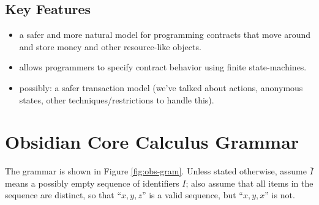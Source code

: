 \documentclass[runningheads,a4paper]{llncs}
\begin{document}
\subsection{Key Features}

\begin{itemize}
\item a safer and more natural model for programming contracts that move around and store money and other resource-like objects.
\item allows programmers to specify contract behavior using finite state-machines.
\item possibly: a safer transaction model (we've talked about actions, anonymous states, other techniques/restrictions to handle this).
\end{itemize}

\fi

\section{Obsidian Core Calculus Grammar}

The grammar is shown in Figure \ref{fig:obs-gram}. Unless stated otherwise, assume $\overline{I}$ means a possibly empty sequence of identifiers $I$; also assume that all items in the sequence are distinct, so that ``$x, y, z$'' is a valid sequence, but ``$x, y, x$'' is not.\\

\newcommand{\stateS}{\texttt{state}}
\newcommand{\ownedS}{\texttt{owned}}
\newcommand{\readonlyS}{\texttt{readonly}}
\newcommand{\sharedS}{\texttt{shared}}
\newcommand{\contractS}{\texttt{contract}}
\newcommand{\extcontractS}{\texttt{external\ contract}}
\newcommand{\letS}{\texttt{let}}
\newcommand{\throwS}{\texttt{throw}}
\newcommand{\tryS}{\texttt{try}}
\newcommand{\catchS}{\texttt{catch}}
\newcommand{\thisS}{\texttt{this}}
\newcommand{\inS}{\texttt{in}}
\newcommand{\caseS}{\texttt{case}}
\newcommand{\defaultS}{\texttt{default}}
\newcommand{\newS}{\texttt{new}}
\newcommand{\permS}{\triangleright}
\newcommand{\functionS}{\texttt{function}}
\newcommand{\transactionS}{\texttt{transaction}}
\newcommand{\voidS}{\textsf{void}}
\newcommand{\unpackS}{\texttt{unpack}}
\newcommand{\packS}{\texttt{pack_to}}
\newcommand{\withS}{\texttt{returns}}
\newcommand{\asS}{\texttt{as}}
\newcommand{\ofS}{\texttt{managed_by}}
\newcommand{\trueS}{\textsf{t}}
\newcommand{\falseS}{\textsf{f}}
\newcommand{\constS}{\texttt{const}}
\newcommand{\ifS}{\texttt{if}}
\newcommand{\thenS}{\texttt{then}}
\newcommand{\elseS}{\texttt{else}}
\newcommand{\resS}{\texttt{res}}
\newcommand{\transactionLabelS}{\mathit{TL}}
\newcommand{\methDeclS}{\mathit{MethDecl}}
\newcommand{\methBodyS}{\mathit{MethBody}}
\end{document}

